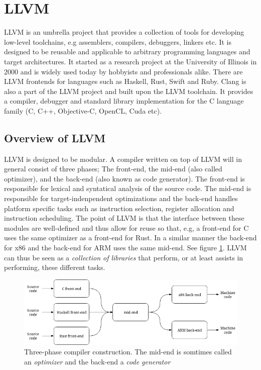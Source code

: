 \section{LLVM}
LLVM is an umbrella project that provides a collection of tools for developing low-level
toolchains, e.g assemblers, compilers, debuggers, linkers etc. It is designed to be reusable and
applicable to arbitrary programming languages and target architectures. It started as a
research project at the University of Illinois in 2000 and is widely used today by hobbyists
and professionals alike. There are LLVM frontends for languages such as Haskell, Rust,
Swift and Ruby. Clang is also a part of the LLVM project and built upon
the LLVM toolchain. It provides a compiler, debugger and standard library implementation
for the C language family (C, C++, Objective-C, OpenCL, Cuda etc).



\subsection{Overview of LLVM}

LLVM is designed to be modular. A compiler written on top of LLVM will in general consist
of three phases; The front-end, the mid-end (also called optimizer), and the back-end
(also known as code generator). The front-end is responsible for lexical and syntatical
analysis of the source code. The mid-end is responsible for target-indenpendent optimizations
and the back-end handles platform specific tasks such as instruction selection, register
allocation and instruction scheduling. The point of LLVM is that the interface between
these modules are well-defined and thus allow for reuse so that, e.g, a front-end for
C uses the same optimizer as a front-end for Rust. In a similar manner the back-end
for x86 and the back-end for ARM uses the same mid-end. See figure \ref{fig:three_phase_compiler}.
LLVM can thus be seen as a \textit{collection of libraries} that perform, or at least
assists in performing, these different tasks.

\begin{figure}[h]
	\centering
	\includegraphics[width=12cm]{background/llvm/figures/three_phase_compiler}
	\caption{Three-phase compiler construction. The mid-end is somtimes called an \textit{optimizer}
	and the back-end a \textit{code generator}}
	\label{fig:three_phase_compiler}
\end{figure}

